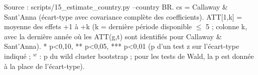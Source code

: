 \begin{table}
\begin{threeparttable}
\begin{tablenotes}\footnotesize
\item Source : scripts/15\_estimate\_country.py --country BR. cs = Callaway \& Sant'Anna (écart-type avec covariance complète des coefficients). ATT[1,k] = moyenne des effets +1 à +k (k = dernière période disponible $\leq$ 5 ; colonne k, avec la dernière année où les ATT(g,t) sont identifiés pour Callaway \& Sant'Anna). * p<0,10, ** p<0,05, *** p<0,01 (p d'un test z sur l'écart-type indiqué ; $^{w}$ : p du wild cluster bootstrap ; pour les tests de Wald, la p est donnée à la place de l'écart-type).
\end{tablenotes}
\end{threeparttable}
\end{table}

